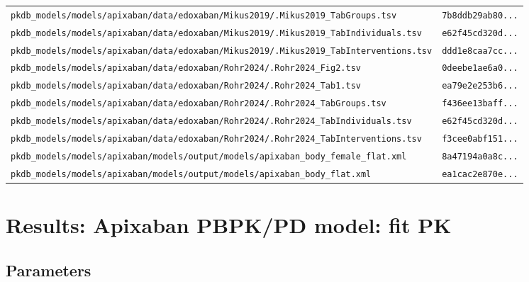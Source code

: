 \begin{longtable}{ll}
\texttt{pkdb\_models/models/apixaban/data/edoxaban/Mikus2019/.Mikus2019\_TabGroups.tsv} & \texttt{7b8ddb29ab80...} \\
\texttt{pkdb\_models/models/apixaban/data/edoxaban/Mikus2019/.Mikus2019\_TabIndividuals.tsv} & \texttt{e62f45cd320d...} \\
\texttt{pkdb\_models/models/apixaban/data/edoxaban/Mikus2019/.Mikus2019\_TabInterventions.tsv} & \texttt{ddd1e8caa7cc...} \\
\texttt{pkdb\_models/models/apixaban/data/edoxaban/Rohr2024/.Rohr2024\_Fig2.tsv} & \texttt{0deebe1ae6a0...} \\
\texttt{pkdb\_models/models/apixaban/data/edoxaban/Rohr2024/.Rohr2024\_Tab1.tsv} & \texttt{ea79e2e253b6...} \\
\texttt{pkdb\_models/models/apixaban/data/edoxaban/Rohr2024/.Rohr2024\_TabGroups.tsv} & \texttt{f436ee13baff...} \\
\texttt{pkdb\_models/models/apixaban/data/edoxaban/Rohr2024/.Rohr2024\_TabIndividuals.tsv} & \texttt{e62f45cd320d...} \\
\texttt{pkdb\_models/models/apixaban/data/edoxaban/Rohr2024/.Rohr2024\_TabInterventions.tsv} & \texttt{f3cee0abf151...} \\
\texttt{pkdb\_models/models/apixaban/models/output/models/apixaban\_body\_female\_flat.xml} & \texttt{8a47194a0a8c...} \\
\texttt{pkdb\_models/models/apixaban/models/output/models/apixaban\_body\_flat.xml} & \texttt{ea1cac2e870e...} \\
\end{longtable}

\section{Results: Apixaban PBPK/PD model: fit PK}

\subsection{Parameters}

